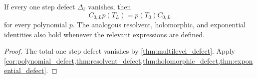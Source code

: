 \begin{corollary}\label{cor:exact_compatibility}
If every one step defect $\Delta_\ell$ vanishes, then
\[
C_{0,L}p(T_L)=p(T_0)C_{0,L}
\]
for every polynomial $p$.  The analogous resolvent, holomorphic, and exponential identities also hold whenever the relevant expressions are defined.
\end{corollary}

\begin{proof}
The total one step defect vanishes by \cref{thm:multilevel_defect}.  Apply \cref{cor:polynomial_defect,thm:resolvent_defect,thm:holomorphic_defect,thm:exponential_defect}.
\end{proof}


